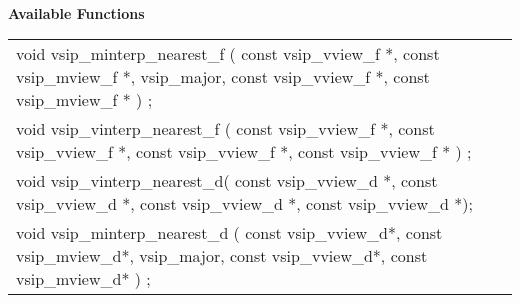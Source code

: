 \\\cvsiplh
\newline \hspace*{.8cm} \vspace*{.1cm} \textbf{Available Functions }
\newline \hspace*{1.1cm} {
\ttfamily
\begin{tabular}[H]{l}
void vsip\_minterp\_nearest\_f ( const vsip\_vview\_f *, const vsip\_mview\_f *, vsip\_major, const vsip\_vview\_f *, const vsip\_mview\_f * ) ;\\
void vsip\_vinterp\_nearest\_f ( const vsip\_vview\_f *, const vsip\_vview\_f *, const vsip\_vview\_f *, const vsip\_vview\_f * ) ;\\
void vsip\_vinterp\_nearest\_d( const vsip\_vview\_d *, const vsip\_vview\_d *, const vsip\_vview\_d *, const vsip\_vview\_d *);\\
void vsip\_minterp\_nearest\_d ( const vsip\_vview\_d*, const vsip\_mview\_d*, vsip\_major, const vsip\_vview\_d*, const vsip\_mview\_d* ) ;\\
\end{tabular}
}\\
\\\pyjvsiph
{}
